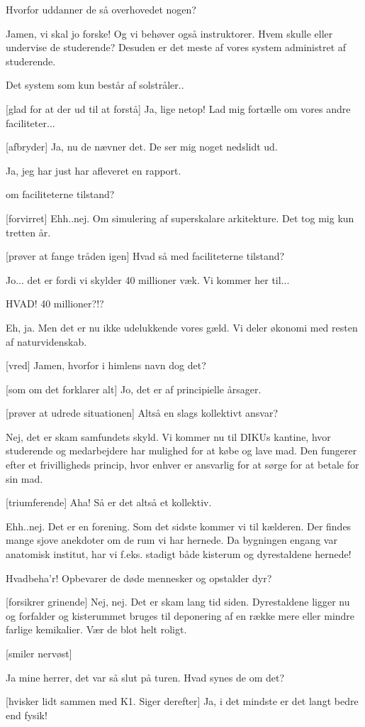 \documentclass[a4paper,11pt]{article}
\begin{document}
\begin{sketch}
 Hvorfor uddanner de så overhovedet nogen?

 Jamen, vi skal jo forske! Og vi behøver også instruktorer. Hvem skulle
eller undervise de studerende? Desuden er det meste af vores system
administret af studerende.

 Det system som kun består af solstråler..

 [glad for at der ud til at forstå] Ja, lige netop! Lad mig fortælle om
vores andre faciliteter...

[afbryder] Ja, nu de nævner det. De ser mig noget nedslidt ud.

 Ja, jeg har just har afleveret en rapport.

 om faciliteterne tilstand?

[forvirret] Ehh..nej. Om simulering af superskalare arkitekture. Det
tog mig kun tretten år. 

[prøver at fange tråden igen] Hvad så med faciliteterne tilstand?

 Jo... det er fordi vi skylder 40 millioner væk. Vi kommer her
til...

 HVAD! 40 millioner?!?

 Eh, ja. Men det er nu ikke udelukkende vores gæld. Vi deler økonomi
med resten af naturvidenskab.

[vred] Jamen, hvorfor i himlens navn dog det?

[som om det forklarer alt] Jo, det er af principielle årsager.

[prøver at udrede situationen] Altså en slags kollektivt ansvar?

 Nej, det er skam samfundets skyld.  Vi kommer nu til
DIKUs kantine, hvor studerende og medarbejdere har mulighed for at købe og lave
mad. Den fungerer efter et frivilligheds princip, hvor enhver er ansvarlig for at
sørge for at betale for sin mad.

[triumferende] Aha! Så er det altså et kollektiv.

 Ehh..nej. Det er en forening. Som det sidste kommer vi til kælderen. Der
findes mange sjove anekdoter om de rum vi har hernede. Da bygningen engang var
anatomisk institut, har vi f.eks. stadigt både kisterum og dyrestaldene hernede!

 Hvadbeha'r! Opbevarer de døde mennesker og opstalder dyr?

[forsikrer grinende] Nej, nej. Det er skam lang tid siden. Dyrestaldene
ligger nu og forfalder og kisterummet bruges til deponering af en række
mere eller mindre farlige kemikalier. Vær de blot helt roligt.

[smiler nervøst]

 Ja mine herrer, det var så slut på turen. Hvad synes de om det?

[hvisker lidt sammen med K1. Siger derefter] Ja, i det mindste er det
langt bedre end fysik! 




\end{sketch}
\end{document}

